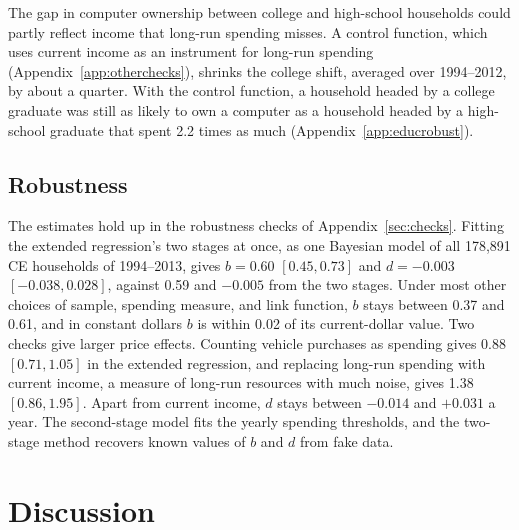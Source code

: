 \documentclass[11pt]{article}
\begin{document}
The gap in computer ownership between college and high-school households could partly reflect income that long-run spending misses. A control function, which uses current income as an instrument for long-run spending (Appendix~\ref{app:otherchecks}), shrinks the college shift, averaged over 1994--2012, by about a quarter. With the control function, a household headed by a college graduate was still as likely to own a computer as a household headed by a high-school graduate that spent 2.2 times as much (Appendix~\ref{app:educrobust}).

\FloatBarrier
\subsection{Robustness}
\label{sec:robust}

The estimates hold up in the robustness checks of Appendix~\ref{sec:checks}. Fitting the extended regression's two stages at once, as one Bayesian model of all 178{,}891 CE households of 1994--2013, gives $b = 0.60$ $[0.45, 0.73]$ and $d = -0.003$ $[-0.038, 0.028]$, against 0.59 and $-0.005$ from the two stages. Under most other choices of sample, spending measure, and link function, $b$ stays between 0.37 and 0.61, and in constant dollars $b$ is within 0.02 of its current-dollar value. Two checks give larger price effects. Counting vehicle purchases as spending gives 0.88 $[0.71, 1.05]$ in the extended regression, and replacing long-run spending with current income, a measure of long-run resources with much noise, gives 1.38 $[0.86, 1.95]$. Apart from current income, $d$ stays between $-0.014$ and $+0.031$ a year. The second-stage model fits the yearly spending thresholds, and the two-stage method recovers known values of $b$ and $d$ from fake data.

\section{Discussion}
\label{sec:discussion}
\end{document}
